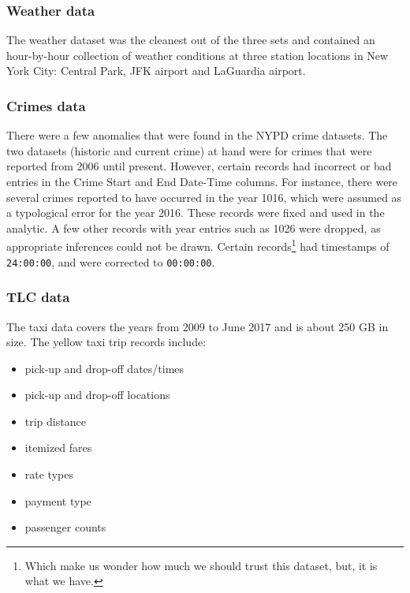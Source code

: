\documentclass{sigkddExp}
\begin{document}
\subsubsection{Weather data} 

The weather dataset was the cleanest out of the three sets and contained an hour-by-hour collection of weather conditions at three station locations in New York City: Central Park, JFK airport and LaGuardia airport. 

\subsubsection{Crimes data}
There were a few anomalies that were found in the NYPD crime datasets. The two datasets (historic and current crime) at hand were for crimes that were reported from 2006 until present. However, certain records had incorrect or bad entries in the Crime Start and End Date-Time columns. For instance, there were several crimes reported to have occurred in the year 1016, which were assumed as a typological error for the year 2016. These records were fixed and used in the analytic. A few other records with year entries such as 1026 were dropped, as appropriate inferences could not be drawn. Certain records\footnote{Which make us wonder how much we should trust this dataset, but, it is what we have.} had timestamps of \texttt{24:00:00}, and were corrected to \texttt{00:00:00}.

\subsubsection{TLC data}

The taxi data covers the years from 2009 to June 2017 and is about 250 GB in size. The yellow taxi trip records include:

\begin{itemize}
\item pick-up and drop-off dates/times 
\item pick-up and drop-off locations 
\item trip distance
\item itemized fares 
\item rate types 
\item payment type 
\item passenger counts 
\end{itemize}
\end{document}
